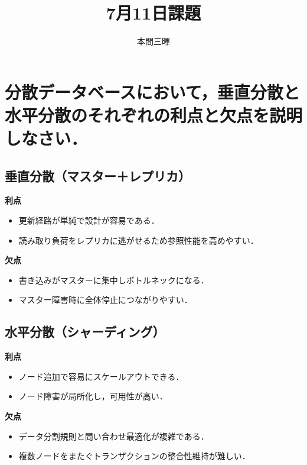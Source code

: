 \documentclass[titlepage,a4paper]{jsarticle}
\title{7月11日課題}
\author{本間三暉}
\begin{document}
\maketitle

\section{分散データベースにおいて，垂直分散と水平分散のそれぞれの利点と欠点を説明しなさい．}
\subsection*{垂直分散（マスター＋レプリカ）}

\textbf{利点}
\begin{itemize}
  \item 更新経路が単純で設計が容易である．
  \item 読み取り負荷をレプリカに逃がせるため参照性能を高めやすい．
\end{itemize}

\textbf{欠点}
\begin{itemize}
  \item 書き込みがマスターに集中しボトルネックになる．
  \item マスター障害時に全体停止につながりやすい．
\end{itemize}

\subsection*{水平分散（シャーディング）}

\textbf{利点}
\begin{itemize}
  \item ノード追加で容易にスケールアウトできる．
  \item ノード障害が局所化し，可用性が高い．
\end{itemize}

\textbf{欠点}
\begin{itemize}
  \item データ分割規則と問い合わせ最適化が複雑である．
  \item 複数ノードをまたぐトランザクションの整合性維持が難しい．
\end{itemize}
\end{document}

